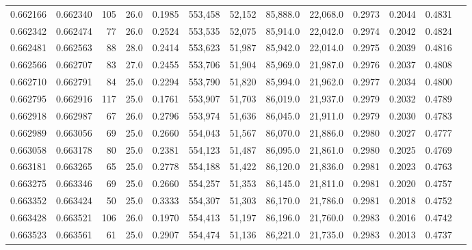 \begin{tabular}{rrrrrrrrrrrrr}
0.662166 & 0.662340 &   105 & 26.0 &                                     0.1985 & 553,458 &  52,152 &  85,888.0 &  22,068.0 & 0.2973 & 0.2044 & 0.4831 \\
0.662342 & 0.662474 &    77 & 26.0 &                                     0.2524 & 553,535 &  52,075 &  85,914.0 &  22,042.0 & 0.2974 & 0.2042 & 0.4824 \\
0.662481 & 0.662563 &    88 & 28.0 &                                     0.2414 & 553,623 &  51,987 &  85,942.0 &  22,014.0 & 0.2975 & 0.2039 & 0.4816 \\
0.662566 & 0.662707 &    83 & 27.0 &                                     0.2455 & 553,706 &  51,904 &  85,969.0 &  21,987.0 & 0.2976 & 0.2037 & 0.4808 \\
0.662710 & 0.662791 &    84 & 25.0 &                                     0.2294 & 553,790 &  51,820 &  85,994.0 &  21,962.0 & 0.2977 & 0.2034 & 0.4800 \\
0.662795 & 0.662916 &   117 & 25.0 &                                     0.1761 & 553,907 &  51,703 &  86,019.0 &  21,937.0 & 0.2979 & 0.2032 & 0.4789 \\
0.662918 & 0.662987 &    67 & 26.0 &                                     0.2796 & 553,974 &  51,636 &  86,045.0 &  21,911.0 & 0.2979 & 0.2030 & 0.4783 \\
0.662989 & 0.663056 &    69 & 25.0 &                                     0.2660 & 554,043 &  51,567 &  86,070.0 &  21,886.0 & 0.2980 & 0.2027 & 0.4777 \\
0.663058 & 0.663178 &    80 & 25.0 &                                     0.2381 & 554,123 &  51,487 &  86,095.0 &  21,861.0 & 0.2980 & 0.2025 & 0.4769 \\
0.663181 & 0.663265 &    65 & 25.0 &                                     0.2778 & 554,188 &  51,422 &  86,120.0 &  21,836.0 & 0.2981 & 0.2023 & 0.4763 \\
0.663275 & 0.663346 &    69 & 25.0 &                                     0.2660 & 554,257 &  51,353 &  86,145.0 &  21,811.0 & 0.2981 & 0.2020 & 0.4757 \\
0.663352 & 0.663424 &    50 & 25.0 &                                     0.3333 & 554,307 &  51,303 &  86,170.0 &  21,786.0 & 0.2981 & 0.2018 & 0.4752 \\
0.663428 & 0.663521 &   106 & 26.0 &                                     0.1970 & 554,413 &  51,197 &  86,196.0 &  21,760.0 & 0.2983 & 0.2016 & 0.4742 \\
0.663523 & 0.663561 &    61 & 25.0 &                                     0.2907 & 554,474 &  51,136 &  86,221.0 &  21,735.0 & 0.2983 & 0.2013 & 0.4737 \\

\end{tabular}
